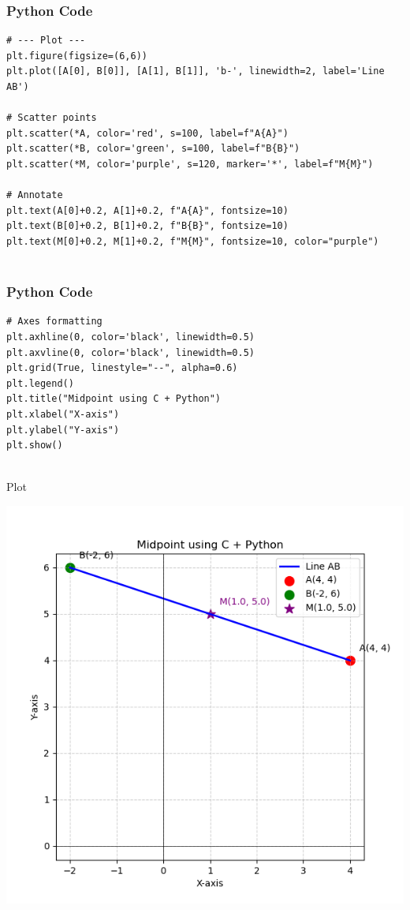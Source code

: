 \documentclass{beamer}
\begin{document}
\begin{frame}[fragile]
    \frametitle{Python Code}

    \begin{lstlisting}
# --- Plot ---
plt.figure(figsize=(6,6))
plt.plot([A[0], B[0]], [A[1], B[1]], 'b-', linewidth=2, label='Line AB')

# Scatter points
plt.scatter(*A, color='red', s=100, label=f"A{A}")
plt.scatter(*B, color='green', s=100, label=f"B{B}")
plt.scatter(*M, color='purple', s=120, marker='*', label=f"M{M}")

# Annotate
plt.text(A[0]+0.2, A[1]+0.2, f"A{A}", fontsize=10)
plt.text(B[0]+0.2, B[1]+0.2, f"B{B}", fontsize=10)
plt.text(M[0]+0.2, M[1]+0.2, f"M{M}", fontsize=10, color="purple")


    \end{lstlisting}
\end{frame}
\begin{frame}[fragile]
    \frametitle{Python Code}

    \begin{lstlisting}
# Axes formatting
plt.axhline(0, color='black', linewidth=0.5)
plt.axvline(0, color='black', linewidth=0.5)
plt.grid(True, linestyle="--", alpha=0.6)
plt.legend()
plt.title("Midpoint using C + Python")
plt.xlabel("X-axis")
plt.ylabel("Y-axis")
plt.show()


    \end{lstlisting}
\end{frame}



\begin{frame}{Plot}
    \begin{center}
        \includegraphics[width=\columnwidth, height=0.8\textheight, keepaspectratio]{figs/figure1.png}
    \end{center}
\end{frame}
\end{document}
